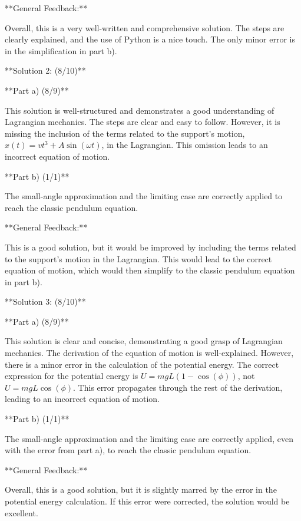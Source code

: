 \documentclass[a4paper,11pt]{article}
\begin{document}
**General Feedback:**

Overall, this is a very well-written and comprehensive solution. The steps are clearly explained, and the use of Python is a nice touch. The only minor error is in the simplification in part b).



**Solution 2: (8/10)**

**Part a) (8/9)**

This solution is well-structured and demonstrates a good understanding of Lagrangian mechanics. The steps are clear and easy to follow. However, it is missing the inclusion of the terms related to the support's motion, $ x(t) = vt^3 + A\sin(\omega t) $, in the Lagrangian. This omission leads to an incorrect equation of motion.

**Part b) (1/1)**

The small-angle approximation and the limiting case are correctly applied to reach the classic pendulum equation.

**General Feedback:**

This is a good solution, but it would be improved by including the terms related to the support's motion in the Lagrangian. This would lead to the correct equation of motion, which would then simplify to the classic pendulum equation in part b).



**Solution 3: (8/10)**

**Part a) (8/9)**

This solution is clear and concise, demonstrating a good grasp of Lagrangian mechanics. The derivation of the equation of motion is well-explained. However, there is a minor error in the calculation of the potential energy. The correct expression for the potential energy is \( U = mgL(1 - \cos(\phi)) \), not \( U = mgL\cos(\phi) \). This error propagates through the rest of the derivation, leading to an incorrect equation of motion.

**Part b) (1/1)**

The small-angle approximation and the limiting case are correctly applied, even with the error from part a), to reach the classic pendulum equation.

**General Feedback:**

Overall, this is a good solution, but it is slightly marred by the error in the potential energy calculation. If this error were corrected, the solution would be excellent.
\end{document}
